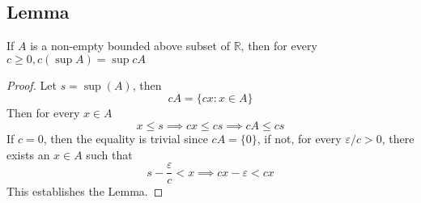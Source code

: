 \documentclass[../../main.tex]{subfiles}
\begin{document}
\subsection{Lemma}
\begin{lemma}\label{lemma:mult_with_sup}
    If $A$ is a non-empty bounded above subset of $\mathbb{R}$, then for every  $c\geq 0, c(\sup A) = \sup cA$
\end{lemma}
\begin{proof}
    Let $s = \sup(A)$, then 
    \[
    cA = \{cx: x\in A\}
    \]
    Then for every $x\in A$
    \[
    x\leq s\implies cx \leq cs\implies cA\leq cs
    \]
    If $c=0$, then the equality is trivial since $cA = \{0\}$, if not, for every $\varepsilon/c>0$, there exists an $x\in A$ such that
    \[
    s-\dfrac{\varepsilon}{c}<x\implies cx - \varepsilon< cx
    \]
    This establishes the Lemma.
\end{proof}
\end{document}
